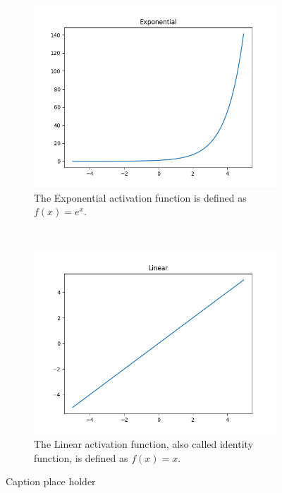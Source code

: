 \begin{figure}[h!]
\begin{subfigure}[t]{0.5\textwidth}
		\centering
		\includegraphics[width=\textwidth]{img/methodology_neuralNetwork_activationFunction_exponential.png}
		\caption{The Exponential activation function is defined as $f(x) = e^x$.}
	\end{subfigure}%
	~ 
	\begin{subfigure}[t]{0.5\textwidth}
		\centering
		\includegraphics[width=\textwidth]{img/methodology_neuralNetwork_activationFunction_linear.png}
		\caption{The Linear activation function, also called identity function, is defined as $f(x) = x$.}
	\end{subfigure}
	\caption{Caption place holder}
	\label{pic:methodology_neuralNetwork_activationFunction}
\end{figure}

